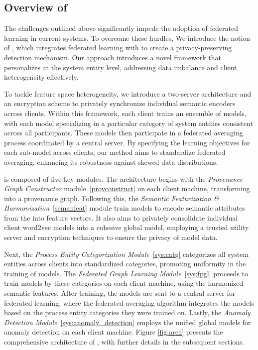 \subsection{Overview of \Sys}
The challenges outlined above significantly impede the adoption of federated learning in current systems. To overcome these hurdles, We introduce the notion of \fpgl , which integrates federated learning with \grl to create a privacy-preserving detection mechanism. Our approach introduces a novel framework that personalizes \grl at the system entity level, addressing data imbalance and client heterogeneity effectively.

To tackle feature space heterogeneity, we introduce a two-server architecture and an encryption scheme to privately synchronize individual semantic encoders across clients. Within this framework, each client trains an ensemble of \gnnshort models, with each model specializing in a particular category of system entities consistent across all participants. These models then participate in a federated averaging process coordinated by a central server. By specifying the learning objectives for each sub-model across clients, our method aims to standardize federated averaging, enhancing its robustness against skewed data distributions.

\Sys is composed of five key modules. The architecture begins with the \textit{Provenance Graph Constructor} module~\ref{provconstruct} on each client machine, transforming \logs into a provenance graph. Following this, the \textit{Semantic Featurization \& Harmonization}~\ref{semanfeat} module train \wordvec models to encode semantic attributes from the \logs into feature vectors. It also aims to privately consolidate individual client word2vec models into a cohesive global model, employing a trusted utility server and encryption techniques to ensure the privacy of model data.

Next, the \textit{Process Entity Categorization Module}~\ref{sys:catg} categorizes all system entities across clients into standardized categories, promoting uniformity in the training of \gnnshort models. The \textit{Federated Graph Learning Module}~\ref{sys:fpgl} proceeds to train \gnnshort models by these categories on each client machine, using the harmonized semantic features. After training, the models are sent to a central server for federated learning, where the federated averaging algorithm integrates the models based on the process entity categories they were trained on. Lastly, the \textit{Anomaly Detection Module}~\ref{sys:anomaly_detection} employs the unified global models for anomaly detection on each client machine. Figure \ref{fig:arch} presents the comprehensive architecture of \Sys, with further details in the subsequent sections.

